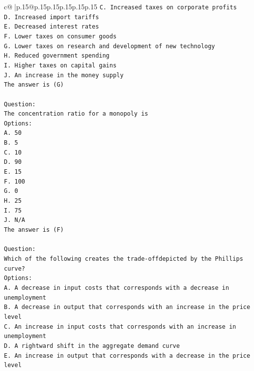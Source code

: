 \documentclass{article}
\begin{document}
{\begin{supertabular}{c@{$\;$}|p{.15\linewidth}@{}p{.15\linewidth}p{.15\linewidth}p{.15\linewidth}p{.15\linewidth}p{.15\linewidth}}
{{{\texttt{C. Increased taxes on corporate profits} \\
\texttt{D. Increased import tariffs} \\
\texttt{E. Decreased interest rates} \\
\texttt{F. Lower taxes on consumer goods} \\
\texttt{G. Lower taxes on research and development of new technology} \\
\texttt{H. Reduced government spending} \\
\texttt{I. Higher taxes on capital gains} \\
\texttt{J. An increase in the money supply} \\
\texttt{The answer is (G)} \\
\\ 
\texttt{Question:} \\
\texttt{The concentration ratio for a monopoly is} \\
\texttt{Options:} \\
\texttt{A. 50} \\
\texttt{B. 5} \\
\texttt{C. 10} \\
\texttt{D. 90} \\
\texttt{E. 15} \\
\texttt{F. 100} \\
\texttt{G. 0} \\
\texttt{H. 25} \\
\texttt{I. 75} \\
\texttt{J. N/A} \\
\texttt{The answer is (F)} \\
\\ 
\texttt{Question:} \\
\texttt{Which of the following creates the trade{-}offdepicted by the Phillips curve?} \\
\texttt{Options:} \\
\texttt{A. A decrease in input costs that corresponds with a decrease in unemployment} \\
\texttt{B. A decrease in output that corresponds with an increase in the price level} \\
\texttt{C. An increase in input costs that corresponds with an increase in unemployment} \\
\texttt{D. A rightward shift in the aggregate demand curve} \\
\texttt{E. An increase in output that corresponds with a decrease in the price level} \\
}}}
\end{supertabular}}
\end{document}
